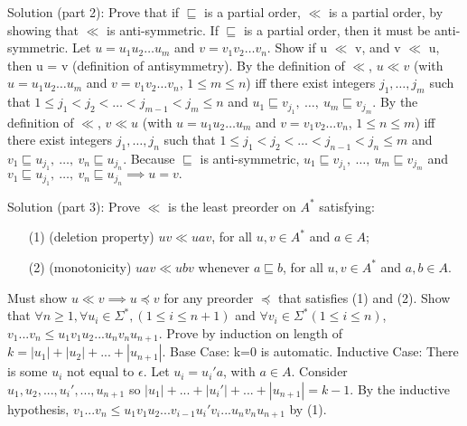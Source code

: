 \documentclass[12pt]{article}
\begin{document}
Solution (part 2): Prove that if $\sqsubseteq $ is a partial order,
$\ll$ is a partial order, by showing that $\ll$ is anti-symmetric.
If $\sqsubseteq $ is a partial order, then it must be anti-symmetric.
Let $u=u_{1}u_{2}\ldots u_{m}$ and $v=v_{1}v_{2}\ldots v_{n}$.
Show if u $\ll$ v, and v $\ll$ u, then u = v (definition of antisymmetry).
\newline
By the definition of $\ll$, $u \ll v$ (with $u=u_{1}u_{2}\ldots u_{m}$ and
$v=v_{1}v_{2}\ldots v_{n}$, $1\leq m\leq n$) iff there exist integers $j_{1},
\ldots,j_{m}$ such that $1\leq j_{1} < j_{2} < \ldots < j_{m-1} < j_{m} \leq n$
and $u_{1} \sqsubseteq v_{j_{1}},\ \ldots,\ u_{m} \sqsubseteq v_{j_{m}}$.
By the definition of $\ll$, $v \ll u$ (with $u=u_{1}u_{2}\ldots u_{m}$ and
$v=v_{1}v_{2}\ldots v_{n}$, $1\leq n\leq m$)
iff there exist integers $j_{1},\ldots,j_{n}$ such that
$1\leq j_{1} < j_{2} < \ldots < j_{n-1} < j_{n} \leq m$ and
$v_{1} \sqsubseteq u_{j_{1}},\ \ldots,\ v_{n} \sqsubseteq u_{j_{n}}.$
\newline
Because $\sqsubseteq $ is anti-symmetric, $u_{1} \sqsubseteq v_{j_{1}},\ \ldots,
\ u_{m} \sqsubseteq v_{j_{m}}$ and $v_{1} \sqsubseteq u_{j_{1}},\ \ldots,
\ v_{n} \sqsubseteq u_{j_{n}} \implies u = v.$

\medskip

Solution (part 3): Prove $\ll$ is the least preorder on $A^\ast$ satisfying:
\begin{enumerate}
\item[(1)] (deletion property)
$uv \ll uav$, for all $u, v\in A^{*}$ and $a\in A$;
\medskip
\item[(2)] (monotonicity) $uav \ll ubv$ whenever $a \sqsubseteq b$,
for all $u, v\in A^{*}$ and $a, b\in A$.
\end{enumerate}

\medskip

Must show $u \ll v \implies u \preceq v$ for any preorder $ \preceq $ that satisfies (1) and (2).
\newline
Show that $\forall n \ge 1, \forall u_i \in \Sigma^\ast , (1 \le i \le n+1)$ and $ \forall v_i \in \Sigma^\ast (1 \le i \le n)$,
$v_1...v_n \le u_1v_1u_2...u_nv_nu_{n+1}$. Prove by induction on length of $k= |u_1|+|u_2|+ ... +|u_{n+1}|.$ 
\newline
Base Case: k=0 is automatic. 
\newline
Inductive Case: There is some $u_i$ not equal to $ \epsilon$. Let $u_i = u_i ' a$, with $a \in A$.
\newline
Consider $u_1 ,u_2 , ... , u_i ' , ... , u_{n+1}$  so  $|u_1| + ... + |u_i '| + ... + |u_{n+1}| = k-1$. 
\newline
By the inductive hypothesis,
$v_1 ... v_n \le u_1 v_1 u_2 ... v_{i-1} u_i ' v_{i}...u_nv_nu_{n+1}$ by (1).
\end{document}
